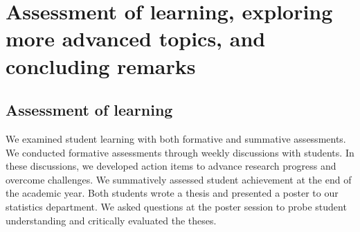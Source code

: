 \documentclass[
]{article}
\begin{document}
\hypertarget{assessment-of-learning-exploring-more-advanced-topics-and-concluding-remarks}{%
\section{Assessment of learning, exploring more advanced topics, and concluding remarks}\label{assessment-of-learning-exploring-more-advanced-topics-and-concluding-remarks}}

\hypertarget{assessment-of-learning}{%
\subsection{Assessment of learning}\label{assessment-of-learning}}

We examined student learning with both formative and summative assessments.
We conducted formative assessments through weekly discussions with students.
In these discussions, we developed action items to advance research progress and overcome
challenges. We summatively assessed student achievement at the end of the academic year.
Both students wrote a thesis and presented a poster to our statistics department.
We asked questions at the poster session to probe student understanding and critically
evaluated the theses.
\end{document}
